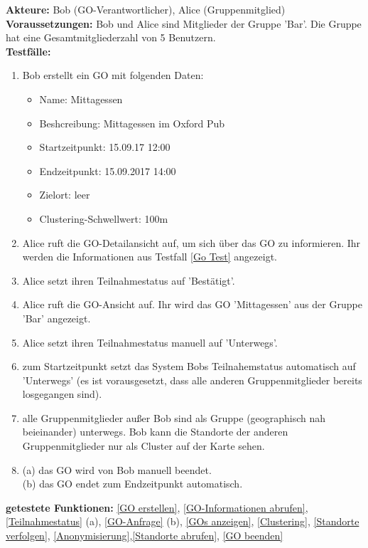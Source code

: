 \documentclass[parskip=full]{scrartcl}
\def\threedigits#1{%
  \ifnum#1<100 0\fi
  \ifnum#1<10 0\fi
  \number#1}
\begin{document}
\textbf{Akteure:} Bob (GO-Verantwortlicher), Alice (Gruppenmitglied)\\

\textbf{Voraussetzungen: }Bob und Alice sind Mitglieder der Gruppe 'Bar'. Die Gruppe hat eine Gesamtmitgliederzahl von 5 Benutzern.\\

\textbf{Testfälle:}
\begin{enumerate}[label={\textbf{/T\protect\threedigits{\theenumi}0/}}, leftmargin=*, resume]
	\item\label{Go Test} Bob erstellt ein GO mit folgenden Daten:
	\begin{itemize}
		\item Name: Mittagessen
		\item Beshcreibung: Mittagessen im Oxford Pub
		\item Startzeitpunkt: 15.09.17 12:00
		\item Endzeitpunkt: 15.09.2017 14:00
		\item Zielort: leer
		\item Clustering-Schwellwert: 100m
	\end{itemize}
	\item Alice ruft die GO-Detailansicht auf, um sich über das GO zu informieren. Ihr werden die Informationen aus Testfall \ref{Go Test} angezeigt.
	\item Alice setzt ihren Teilnahmestatus auf 'Bestätigt'.
	\item Alice ruft die GO-Ansicht auf. Ihr wird das GO 'Mittagessen' aus der Gruppe 'Bar' angezeigt.
	\item Alice setzt ihren Teilnahmestatus manuell auf 'Unterwegs'.
	\item zum Startzeitpunkt setzt das System Bobs Teilnahemstatus automatisch auf 'Unterwegs' (es ist vorausgesetzt, dass alle anderen Gruppenmitglieder bereits losgegangen sind).
	\item alle Gruppenmitglieder außer Bob sind als Gruppe (geographisch nah beieinander) unterwegs. Bob kann die Standorte der anderen Gruppenmitglieder nur als Cluster auf der Karte sehen.
	\item (a) das GO wird von Bob manuell beendet. \\
	 (b) das GO endet zum Endzeitpunkt automatisch.	
\end{enumerate}

\textbf{getestete Funktionen: }\ref{GO erstellen}, \ref{GO-Informationen abrufen}, \ref{Teilnahmestatus} (a), \ref{GO-Anfrage} (b), \ref{GOs anzeigen}, \ref{Clustering}, \ref{Standorte verfolgen}, \ref{Anonymisierung},\ref{Standorte abrufen}, \ref{GO beenden}
\end{document}
